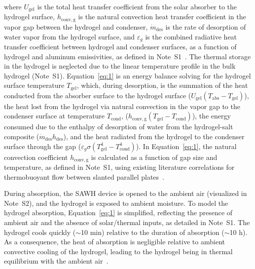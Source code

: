 \documentclass[11pt]{article}
\begin{document}
\noindent where $U_{\mathrm{gel}}$ is the total heat transfer coefficient from the solar absorber to the hydrogel surface, $h_{\mathrm{conv,g}}$ is the natural convection heat transfer coefficient in the vapor gap between the hydrogel and condenser, $\dot{m}_{\mathrm{des}}$ is the rate of desorption of water vapor from the hydrogel surface, and $\varepsilon_g$ is the combined radiative heat transfer coefficient between hydrogel and condenser surfaces, as a function of hydrogel and aluminum emissivities, as defined in Note~S1~\cite{kaviany2011}. The thermal storage in the hydrogel is neglected due to the linear temperature profile in the bulk hydrogel (Note~S1). Equation~\ref{eq:1} is an energy balance solving for the hydrogel surface temperature $T_{\mathrm{gel}}$, which, during desorption, is the summation of the heat conducted from the absorber surface to the hydrogel surface ($U_{\mathrm{gel}}(T_{\mathrm{abs}} - T_{\mathrm{gel}})$), the heat lost from the hydrogel via natural convection in the vapor gap to the condenser surface at temperature $T_{\mathrm{cond}}$, ($h_{\mathrm{conv,g}}(T_{\mathrm{gel}} - T_{\mathrm{cond}})$), the energy consumed due to the enthalpy of desorption of water from the hydrogel-salt composite ($\dot{m}_{\mathrm{des}} h_{\mathrm{des}}$), and the heat radiated from the hydrogel to the condenser surface through the gap ($\varepsilon_g \sigma (T_{\mathrm{gel}}^4 - T_{\mathrm{cond}}^4)$). In Equation~\ref{eq:1}, the natural convection coefficient $h_{\mathrm{conv,g}}$ is calculated as a function of gap size and temperature, as defined in Note~S1, using existing literature correlations for thermobuoyant flow between slanted parallel plates~\cite{hollands1976}.

During absorption, the SAWH device is opened to the ambient air (visualized in Note~S2), and the hydrogel is exposed to ambient moisture. To model the hydrogel absorption, Equation~\ref{eq:1} is simplified, reflecting the presence of ambient air and the absence of solar/thermal inputs, as detailed in Note~S1. The hydrogel cools quickly ($\sim$10 min) relative to the duration of absorption ($\sim$10 h). As a consequence, the heat of absorption is negligible relative to ambient convective cooling of the hydrogel, leading to the hydrogel being in thermal equilibrium with the ambient air~\cite{diazmarin2022c}.
\end{document}
